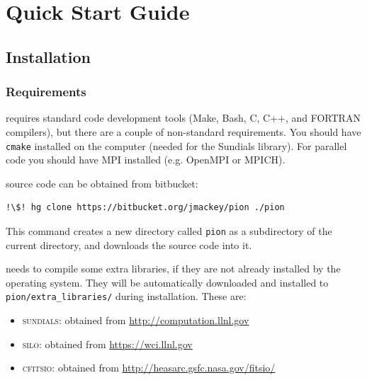 \documentclass[a4paper,11pt]{report}
\begin{document}
\newpage
{}
\tableofcontents
\newpage


\chapter{Quick Start Guide}


\section{Installation}

\subsection{Requirements}
\pion{} requires standard code development tools (Make, Bash, C, C++, and FORTRAN compilers), but there are a couple of non-standard requirements.
You should have \lstinline|cmake| installed on the computer (needed for the Sundials library).
For parallel code you should have MPI installed (e.g. OpenMPI or MPICH).

\pion{} source code can be obtained from bitbucket:
\begin{lstlisting}[language=bash, escapechar=!]
!\$! hg clone https://bitbucket.org/jmackey/pion ./pion
\end{lstlisting}
This command creates a new directory called \lstinline|pion| as a subdirectory of the current directory, and downloads the \pion{} source code into it.

\pion{} needs to compile some extra libraries, if they are not already installed by the operating system.
They will be automatically downloaded and installed to \lstinline|pion/extra_libraries/| during installation.
These are:
\begin{itemize}
\item
\textsc{sundials}: obtained from \href{http://computation.llnl.gov/projects/sundials-suite-nonlinear-differential-algebraic-equation-solvers}{http://computation.llnl.gov}
\item
\textsc{silo}: obtained from \href{https://wci.llnl.gov/simulation/computer-codes/silo}{https://wci.llnl.gov}
\item
\textsc{cfitsio}: obtained from \href{http://heasarc.gsfc.nasa.gov/fitsio/}{http://heasarc.gsfc.nasa.gov/fitsio/}
\end{itemize}
\end{document}
